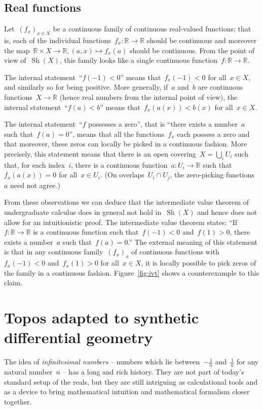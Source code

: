 \documentclass[oneside,reqno]{amsart}
\theoremstyle{definition}
\theoremstyle{plain}
\theoremstyle{remark}
\newcommand{\RR}{\mathbb{R}}
\DeclareMathOperator{\Sh}{Sh}
\renewcommand{\_}{\mathpunct{.}\,}
\newcommand{\?}{\,{:}\,}
\begin{document}
\subsection{Real functions} Let~$(f_x)_{x \in X}$ be a continuous family of
continuous real-valued functions; that is, each of the individual
functions~$f_x : \RR \to \RR$ should be continuous and moreover the map~$\RR
\times X \to \RR, (a,x) \mapsto f_x(a)$ should be continuous.
From the point of view of~$\Sh(X)$, this family looks like a single continuous
function~$f : \RR \to \RR$.

The internal statement~``$f(-1) < 0$'' means that~$f_x(-1) < 0$ for all~$x \in
X$, and similarly so for being positive. More generally, if~$a$ and~$b$ are
continuous functions~$X \to \RR$ (hence real numbers from the internal point of
view), the internal statement~``$f(a) < b$'' means that~$f_x(a(x)) < b(x)$ for
all~$x \in X$.

The internal statement~``$f$ possesses a zero'', that is ``there exists a
number~$a$ such that~$f(a) = 0$'', means that all the functions~$f_x$ each
possess a zero and that moreover, these zeros can locally be picked in a
continuous fashion. More precisely, this statement means that there is an open
covering~$X = \bigcup_i U_i$ such that, for each index~$i$, there is a continuous
function~$a : U_i \to \RR$ such that~$f_x(a(x)) = 0$ for all~$x \in U_i$. (On
overlaps~$U_i \cap U_j$, the zero-picking functions~$a$ need not agree.)

From these observations we can deduce that the intermediate value theorem of
undergraduate calculus does in general not hold in~$\Sh(X)$ and hence does not allow
for an intuitionistic proof. The intermediate value theorem states: ``If~$f : \RR \to \RR$
is a continuous function such that~$f(-1) < 0$ and~$f(1) > 0$, there exists a
number~$a$ such that~$f(a) = 0$.'' The external meaning of this statement is
that in any continuous family~$(f_x)_x$ of continuous functions with~$f_x(-1) <
0$ and~$f_x(1) > 0$ for all~$x \in X$, it is locally possible to pick zeros of
the family in a continuous fashion. Figure~\ref{fig:ivt} shows a counterexample
to this claim.


\section{Topos adapted to synthetic differential geometry}
\label{sect:smooth}

The idea of \emph{infinitesimal numbers} -- numbers which lie between~$-\frac{1}{n}$
and~$\frac{1}{n}$ for any natural number~$n$ -- has a long and rich history. They are
not part of today's standard setup of the reals, but they are still intriguing
as calculational tools and as a device to bring mathematical intuition and
mathematical formalism closer together.
\end{document}
